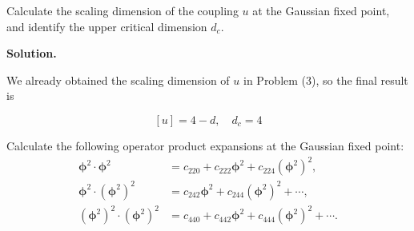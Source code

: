 \documentclass[11pt,a4paper]{article}
\newcounter{problem}
\newcounter{saveequation}
\newenvironment{solution}
{
	\par
	\setcounter{saveequation}{\value{equation}}
	\begingroup
	\setcounter{equation}{0}
	\renewcommand{\theequation}{\arabic{problem}.\arabic{equation}}
	\renewcommand{\theHequation}{sol.\arabic{problem}.\arabic{equation}}
	\noindent\textbf{Solution.}\quad
}
{
	\par
	\endgroup
	\setcounter{equation}{\value{saveequation}}
}
\begin{document}
	\begin{problembox}
		Calculate the scaling dimension of the coupling $u$ at the Gaussian fixed point, and identify the upper critical dimension $d_c$.
	\end{problembox}
	\begin{solution}
		We already obtained the scaling dimension of $u$ in Problem (3), so the final result is
		\begin{finalanswer}
			\begin{equation}
				\label{fin:11}
				[u]=4-d,\quad d_c=4
			\end{equation}
		\end{finalanswer}
	\end{solution}

	\begin{problembox}
		Calculate the following operator product expansions at the Gaussian fixed point:
		\begin{align}
			\boldsymbol{\phi}^2\cdot\boldsymbol{\phi}^2
			&=c_{220}+c_{222}\boldsymbol{\phi}^2+c_{224}(\boldsymbol{\phi}^2)^2,\\
			\boldsymbol{\phi}^2\cdot(\boldsymbol{\phi}^2)^2
			&=c_{242}\boldsymbol{\phi}^2+c_{244}(\boldsymbol{\phi}^2)^2+\cdots,\\
			(\boldsymbol{\phi}^2)^2\cdot(\boldsymbol{\phi}^2)^2
			&=c_{440}+c_{442}\boldsymbol{\phi}^2+c_{444}(\boldsymbol{\phi}^2)^2+\cdots.
		\end{align}
	\end{problembox}
\end{document}
